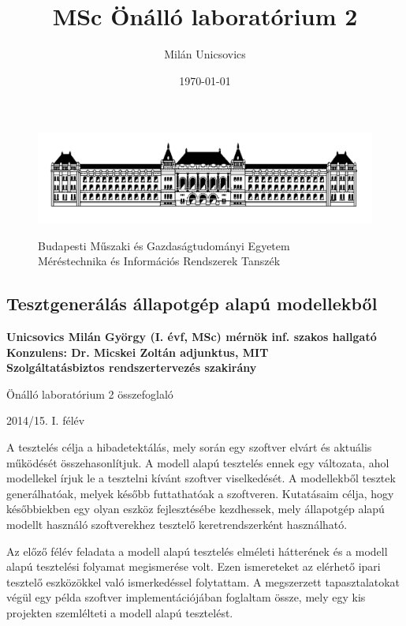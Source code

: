 \documentclass{article}
\author{Milán Unicsovics}
\title{MSc Önálló laboratórium 2}
\date{\today}
\begin{document}
\thispagestyle{empty}
\begin{figure}[htp]
\centering
\includegraphics[scale=0.3]{img/bme.png}
\begin{center}
Budapesti Műszaki és Gazdaságtudományi Egyetem\\
Méréstechnika és Információs Rendszerek Tanszék
\end{center}
\end{figure}
\vspace*{-0.1in}
\begin{center}
\subsection*{Tesztgenerálás állapotgép alapú modellekből}
{\bf
Unicsovics Milán György (I. évf, MSc) mérnök inf. szakos hallgató\\[0.3cm]

Konzulens: Dr. Micskei Zoltán adjunktus, MIT\\[0.3cm]

Szolgáltatásbiztos rendszertervezés szakirány

Önálló laboratórium 2 összefoglaló

2014/15. I. félév
}
\end{center}
\vspace{0.5cm}

A tesztelés célja a hibadetektálás, mely során egy szoftver elvárt és aktuális működését összehasonlítjuk. A modell alapú tesztelés ennek egy változata, ahol modellekel írjuk le a tesztelni kívánt szoftver viselkedését. A modellekből tesztek generálhatóak, melyek később futtathatóak a szoftveren. Kutatásaim célja, hogy későbbiekben egy olyan eszköz fejlesztésébe kezdhessek, mely állapotgép alapú modellt használó szoftverekhez tesztelő keretrendszerként használható.

Az előző félév feladata a modell alapú tesztelés elméleti hátterének és a modell alapú tesztelési folyamat megismerése volt. Ezen ismereteket az elérhető ipari tesztelő eszközökkel való ismerkedéssel folytattam. A megszerzett tapasztalatokat végül egy példa szoftver implementációjában foglaltam össze, mely egy kis projekten szemlélteti a modell alapú tesztelést.
\end{document}
